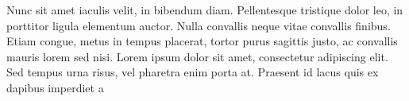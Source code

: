 \documentclass{homework}
\begin{document}
Nunc sit amet iaculis velit, in bibendum diam. Pellentesque tristique dolor leo, in porttitor ligula elementum auctor. Nulla convallis neque vitae convallis finibus. Etiam congue, metus in tempus placerat, tortor purus sagittis justo, ac convallis mauris lorem sed nisi. Lorem ipsum dolor sit amet, consectetur adipiscing elit. Sed tempus urna risus, vel pharetra enim porta at. Praesent id lacus quis ex dapibus imperdiet a
\end{document}
